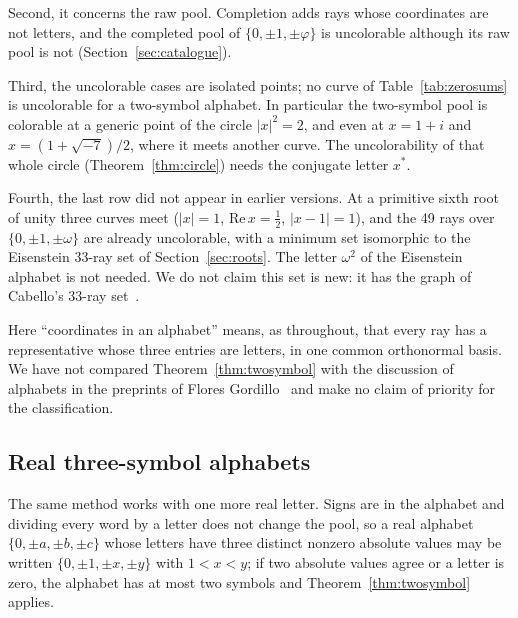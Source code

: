 Second, it concerns the raw pool.  Completion adds rays whose coordinates are not letters, and
the completed pool of $\{0,\pm1,\pm\varphi\}$ is uncolorable although its raw pool is not
(Section~\ref{sec:catalogue}).

Third, the uncolorable cases are isolated points; no curve of Table~\ref{tab:zerosums} is
uncolorable for a two-symbol alphabet.  In particular the two-symbol pool is colorable at a
generic point of the circle $|x|^2=2$, and even at $x=1+i$ and $x=(1+\sqrt{-7})/2$, where it
meets another curve.  The uncolorability of that whole circle (Theorem~\ref{thm:circle}) needs the
conjugate letter $x^{*}$.

Fourth, the last row did not appear in earlier versions.  At a primitive sixth root of unity three curves
meet ($|x|=1$, $\mathrm{Re}\,x=\tfrac12$, $|x-1|=1$), and the 49 rays over $\{0,\pm1,\pm\omega\}$
are already uncolorable, with a minimum set isomorphic to the Eisenstein 33-ray set of
Section~\ref{sec:roots}.  The letter $\omega^2$ of the Eisenstein alphabet is not needed.  We do
not claim this set is new: it has the graph of Cabello's 33-ray set~\cite{Cabello2025simplest}.

Here ``coordinates in an alphabet'' means, as throughout, that every ray has a representative
whose three entries are letters, in one common orthonormal basis.  We have not compared
Theorem~\ref{thm:twosymbol} with the discussion of alphabets in the preprints of Flores
Gordillo~\cite{FloresGordillo2026} and make no claim of priority for the classification.

\subsection{Real three-symbol alphabets}\label{sec:threesymbol}

The same method works with one more real letter.  Signs are in the alphabet and dividing every
word by a letter does not change the pool, so a real alphabet $\{0,\pm a,\pm b,\pm c\}$ whose
letters have three distinct nonzero absolute values may be written $\{0,\pm1,\pm x,\pm y\}$ with
$1<x<y$; if two absolute values agree or a letter is zero, the alphabet has at most two symbols and
Theorem~\ref{thm:twosymbol} applies.

